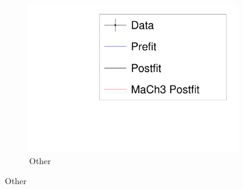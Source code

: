 \begin{figure}
\begin{subfigure}[t]{0.32\textwidth}
		\includegraphics[width=\textwidth, trim={5mm 3mm 15mm 10mm}, clip, page=11]{figures/mach3/banff/mach3banff_mom}
		\caption{Other}
	\end{subfigure}
	

\end{figure}
